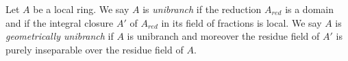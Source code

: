 \begin{definition}
\label{definition-unibranch}
\begin{reference}
\cite[Chapter 0 (23.2.1)]{EGA4}
\end{reference}
Let $A$ be a local ring. We say $A$ is {\it unibranch}
if the reduction $A_{red}$ is a domain and if the integral closure
$A'$ of $A_{red}$ in its field of fractions is local.
We say $A$ is {\it geometrically unibranch} if $A$ is unibranch
and moreover the residue field of $A'$ is purely inseparable over
the residue field of $A$.
\end{definition}